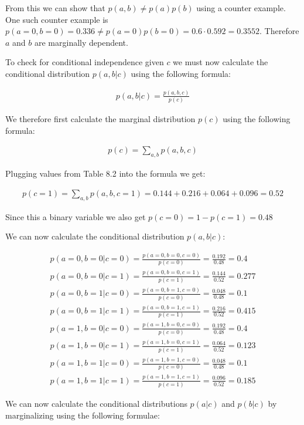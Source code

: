 \documentclass[a4paper, 12pt]{article}
\begin{document}
From this we can show that $p(a,b) \ne p(a)p(b)$ using a counter example. One such counter example is $p(a=0,b=0) = 0.336 \ne p(a=0)p(b=0) = 0.6 \cdot 0.592 = 0.3552$. Therefore $a$ and $b$ are marginally dependent.

To check for conditional independence given $c$ we must now calculate the conditional distribution $p(a,b|c)$ using the following formula:

\begin{align}
	p(a,b|c) = \frac{p(a,b,c)}{p(c)}
\end{align}

We therefore first calculate the marginal distribution $p(c)$ using the following formula:

\begin{align}
	p(c) = \sum_{a,b} p(a,b,c)
\end{align}

Plugging values from Table 8.2 into the formula we get:

\begin{align}
	p(c=1) = \sum_{a,b} p(a,b,c=1) = 0.144 + 0.216 + 0.064 + 0.096 = 0.52
\end{align}

Since this a binary variable we also get $p(c=0) = 1 - p(c=1) = 0.48$

We can now calculate the conditional distribution $p(a,b|c)$:

\begin{align} \label{cond-start}
	p(a=0,b=0|c=0) = \frac{p(a=0,b=0,c=0)}{p(c=0)} = \frac{0.192}{0.48} = 0.4\\
	p(a=0,b=0|c=1) = \frac{p(a=0,b=0,c=1)}{p(c=1)} = \frac{0.144}{0.52} = 0.277\\
	p(a=0,b=1|c=0) = \frac{p(a=0,b=1,c=0)}{p(c=0)} = \frac{0.048}{0.48} = 0.1\\
	p(a=0,b=1|c=1) = \frac{p(a=0,b=1,c=1)}{p(c=1)} = \frac{0.216}{0.52} = 0.415\\
	p(a=1,b=0|c=0) = \frac{p(a=1,b=0,c=0)}{p(c=0)} = \frac{0.192}{0.48} = 0.4\\
	p(a=1,b=0|c=1) = \frac{p(a=1,b=0,c=1)}{p(c=1)} = \frac{0.064}{0.52} = 0.123\\
	p(a=1,b=1|c=0) = \frac{p(a=1,b=1,c=0)}{p(c=0)} = \frac{0.048}{0.48} = 0.1\\
	p(a=1,b=1|c=1) = \frac{p(a=1,b=1,c=1)}{p(c=1)} = \frac{0.096}{0.52} = 0.185
	\label{cond-end}
\end{align}

We can now calculate the conditional distributions $p(a|c)$ and $p(b|c)$ by marginalizing using the following formulae:
\end{document}
